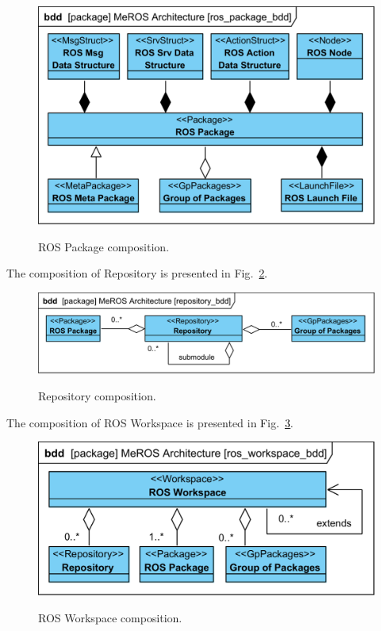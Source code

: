 \documentclass[11pt,oneside,a4paper]{report}
\begin{document}
	\begin{figure}[H]
		\centering
		\begin{center}
			{\includegraphics[scale=1.0]{diagrams/ros_package_bdd.png}}
		\end{center}
		\caption{ROS Package composition.} 
		\label{fig:ros_package_bdd}
	\end{figure}
		
The composition of Repository is presented in Fig.~\ref{fig:repository_bdd}.	
	
	\begin{figure}[H]
		\centering
		\begin{center}
			{\includegraphics[scale=1.0]{diagrams/repository_bdd.png}}
		\end{center}
		\caption{Repository composition.} 
		\label{fig:repository_bdd}
	\end{figure}

The composition of ROS Workspace is presented in Fig.~\ref{fig:ros_workspace_bdd}.

	\begin{figure}[H]
		\centering
		\begin{center}
			{\includegraphics[scale=1.0]{diagrams/ros_workspace_bdd.png}}
		\end{center}
		\caption{ROS Workspace composition.} 
		\label{fig:ros_workspace_bdd}
	\end{figure}

			
\AtNextBibliography{\small}
\printbibliography
	
\end{document}
